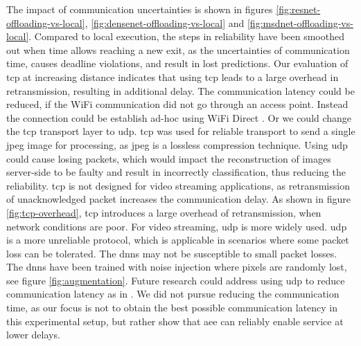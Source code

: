 The impact of communication uncertainties is shown in figures \ref{fig:resnet-offloading-vs-local}, \ref{fig:densenet-offloading-vs-local} and \ref{fig:msdnet-offloading-vs-local}. Compared to local execution, the steps in reliability have been smoothed out when time allows reaching a new exit, as the uncertainties of communication time, causes deadline violations, and result in lost predictions. Our evaluation of \gls{tcp} at increasing distance indicates that using \gls{tcp} leads to a large overhead in retransmission, resulting in additional delay. The communication latency could be reduced, if the WiFi communication did not go through an access point. Instead the connection could be establish ad-hoc using WiFi Direct \cite{noauthor_wi-fi_nodate}. Or we could change the \gls{tcp} transport layer to \gls{udp}. \gls{tcp} was used for reliable transport to send a single jpeg image for processing, as jpeg is a lossless compression technique. Using \gls{udp} could cause losing packets, which would impact the reconstruction of images server-side to be faulty and result in incorrectly classification, thus reducing the reliability. \gls{tcp} is not designed for video streaming applications, as retransmission of unacknowledged packet increases the communication delay. As shown in figure \ref{fig:tcp-overhead}, \gls{tcp} introduces a large overhead of retransmission, when network conditions are poor. For video streaming, \gls{udp} is more widely used. \gls{udp} is a more unreliable protocol, which is applicable in scenarios where some packet loss can be tolerated. The \gls{dnn}s may not be susceptible to small packet losses. The \gls{dnn}s have been trained with noise injection where pixels are randomly lost, see figure \ref{fig:augmentation}. Future research could address using \gls{udp} to reduce communication latency as in \cite{liu_maximizing_2019}. We did not pursue reducing the communication time, as our focus is not to obtain the best possible communication latency in this experimental setup, but rather show that \gls{aee} can reliably enable service at lower delays. 
